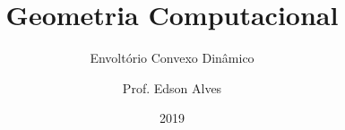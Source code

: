 \title{Geometria Computacional}
\subtitle{Envoltório Convexo Dinâmico}
\date{2019}
\author{Prof. Edson Alves}

